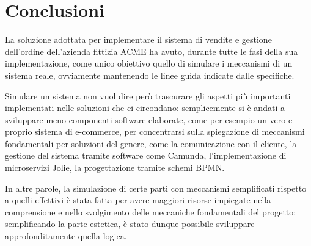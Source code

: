 \section{Conclusioni}

La soluzione adottata per implementare il sistema di vendite e gestione
dell'ordine dell'azienda fittizia ACME ha avuto, durante tutte le fasi
della sua implementazione, come unico obiettivo quello di simulare i
meccanismi di un sistema reale, ovviamente mantenendo le linee guida
indicate dalle specifiche.

Simulare un sistema non vuol dire per\`o trascurare gli aspetti pi\`u
importanti implementati nelle soluzioni che ci circondano: semplicemente
si \`e andati a sviluppare meno componenti software elaborate, come per
esempio un vero e proprio sistema di e-commerce, per concentrarsi sulla
spiegazione di meccanismi fondamentali per soluzioni del genere, come la
comunicazione con il cliente, la gestione del sistema tramite software
come Camunda, l'implementazione di microservizi Jolie, la progettazione
tramite schemi BPMN.

In altre parole, la simulazione di certe parti con meccanismi
semplificati rispetto a quelli effettivi \`e stata fatta per avere
maggiori risorse impiegate nella comprensione e nello svolgimento delle
meccaniche fondamentali del progetto: semplificando la parte estetica,
\`e stato dunque possibile sviluppare approfonditamente quella logica.
